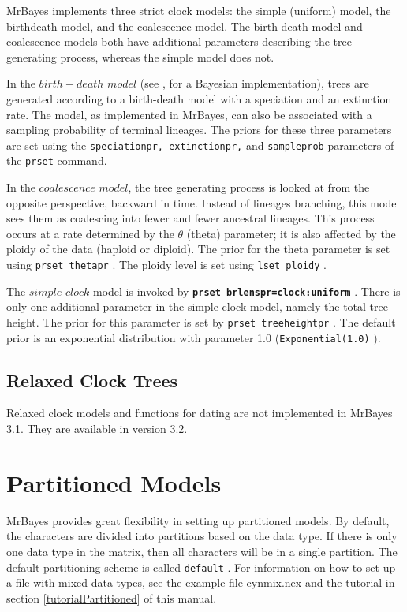 \documentclass[12pt]{book}
\newcommand{\ttt}[1]{\texttt{#1} }
\newcommand{\tb}[1]{\texttt{\textbf{#1}} }
\begin{document}
MrBayes implements three strict clock models: the simple (uniform) model, the birthdeath model, and
the coalescence model. The birth-death model and coalescence models both have additional parameters
describing the tree-generating process, whereas the simple model does not.

In the $birth-death$ $model$ (see \citet{yang97b}, for a Bayesian implementation), trees are
generated according to a birth-death model with a speciation and an extinction rate. The model, as
implemented in MrBayes, can also be associated with a sampling probability of terminal lineages.
The priors for these three parameters are set using the \ttt{speciationpr, extinctionpr,} and
\ttt{sampleprob} parameters of the \ttt{prset} command.

In the $coalescence$ $model$, the tree generating process is looked at from the opposite
perspective, backward in time. Instead of lineages branching, this model sees them as coalescing
into fewer and fewer ancestral lineages. This process occurs at a rate determined by the $\theta$
(theta) parameter; it is also affected by the ploidy of the data (haploid or diploid). The prior
for the theta parameter is set using \ttt{prset thetapr}.  The ploidy level is set using \ttt{lset
ploidy}.

The $simple$ $clock$ model is invoked by \tb{prset brlenspr=clock:uniform}. There is only one
additional parameter in the simple clock model, namely the total tree height.  The prior for this
parameter is set by \ttt{prset treeheightpr}. The default prior is an exponential distribution with
parameter 1.0 (\ttt{Exponential(1.0)}).

\subsection{Relaxed Clock Trees}
Relaxed clock models and functions for dating are not implemented in MrBayes 3.1. They are
available in version 3.2.

\section{Partitioned Models}
MrBayes provides great flexibility in setting up partitioned models. By default, the characters are
divided into partitions based on the data type. If there is only one data type in the matrix, then
all characters will be in a single partition. The default partitioning scheme is called
\ttt{default}. For information on how to set up a file with mixed data types, see the example file
cynmix.nex and the tutorial in section \ref{tutorialPartitioned} of this manual.
\end{document}
